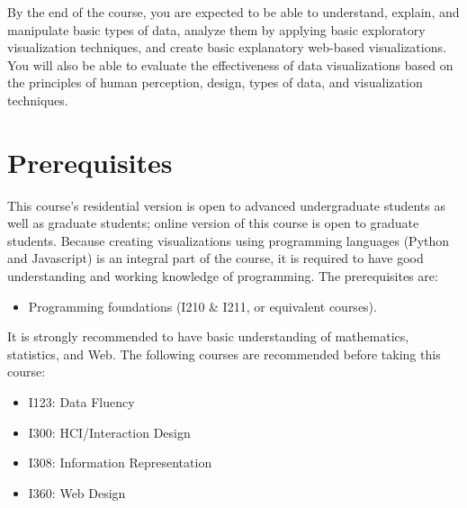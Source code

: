 \documentclass[11pt,article,oneside]{memoir} %
\begin{document}
By the end of the course, you are expected to be able to understand, explain,
and manipulate basic types of data, analyze them by applying basic exploratory
visualization techniques, and create basic explanatory web-based
visualizations. You will also be able to evaluate the effectiveness of data
visualizations based on the principles of human perception, design, types of
data, and visualization techniques. 
 


\section{Prerequisites}%
\label{sec:Prerequisites}

This course's residential version is open to advanced undergraduate students as
well as graduate students; online version of this course is open to graduate
students. Because creating visualizations using programming languages (Python
and Javascript) is an integral part of the course, it is required to have good
understanding and working knowledge of programming. The prerequisites are:
%
\begin{itemize}\vspace{-10pt}
%
    \item Programming foundations (I210 \& I211, or equivalent courses). 
%
\end{itemize}\vspace{-10pt}
%
It is strongly recommended to have basic understanding of mathematics,
statistics, and Web. The following courses are recommended before taking this
course: 
%
\begin{itemize}\vspace{-10pt}
%
\item I123: Data Fluency
\item I300: HCI/Interaction Design
\item I308: Information Representation
\item I360: Web Design
%
\end{itemize}\vspace{-10pt}
\end{document}
